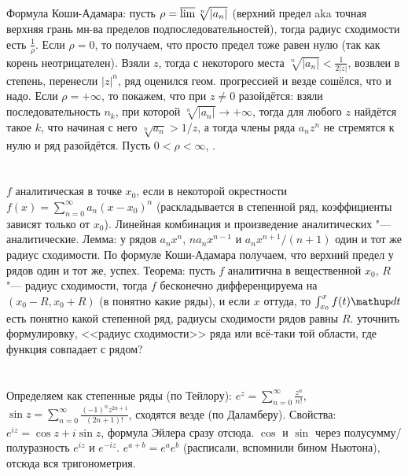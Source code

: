\section{} %
Формула Коши-Адамара: пусть $\rho=\varlimsup\sqrt[n]{|a_n|}$ (верхний предел aka точная верхняя грань мн-ва пределов подпоследовательностей), тогда радиус сходимости есть $\frac1\rho$.
Если $\rho=0$, то получаем, что просто предел тоже равен нулю (так как корень неотрицателен).
Взяли $z$, тогда с некоторого места $\sqrt[n]{|a_n|} < \frac{1}{2|z|}$, возвлеи в степень, перенесли $|z|^n$, ряд оценился геом. прогрессией и везде сошёлся, что и надо.
Если $\rho=+\infty$, то покажем, что при $z \neq 0$ разойдётся: взяли последовательность $n_k$, при которой $\sqrt[n]{|a_n|} \to +\infty$, тогда для любого
$z$ найдётся такое $k$, что начиная с него $\sqrt[n]{a_n} > 1/z$, а тогда члены ряда $a_nz^n$ не стремятся к нулю и ряд разойдётся.
Пусть $0<\rho < \infty$, \TODO.

\section{} %
$f$ аналитическая в точке $x_0$, если в некоторой окрестности $f(x)=\sum_{n=0}^\infty a_n(x-x_0)^n$ (раскладывается в степенной ряд,
коэффициенты зависят только от $x_0$).
Линейная комбинация и произведение аналитических "--- аналитические.
Лемма: у рядов $a_nx^n$, $na_nx^{n-1}$ и $a_nx^{n+1}/(n+1)$ один и тот же радиус сходимости.
По формуле Коши-Адамара получаем, что верхний предел у рядов один и тот же, успех.
Теорема: пусть $f$ аналитична в вещественной $x_0$, $R$ "--- радиус сходимости, тогда $f$ бесконечно дифференцируема на $(x_0-R, x_0+R)$
(в понятно какие ряды), и если $x$ оттуда, то $\int_{x_0}^x f(t) \d t$ есть понятно какой степенной ряд, радиусы сходимости рядов равны $R$.
\TODO уточнить формулировку, <<радиус сходимости>> ряда или всё-таки той области, где функция совпадает с рядом?

\section{} %
\TODO

\section{} %
Определяем как степенные ряды (по Тейлору): $e^z = \sum_{n=0}^\infty \frac{z^n}{n!}$,
$\sin z = \sum_{n=0}^\infty \frac{(-1)^nz^{2n+1}}{(2n+1)!}$, сходятся везде (по Даламберу).
Свойства: $e^{iz}=\cos z + i \sin z$, формула Эйлера сразу отсюда.
$\cos$ и $\sin$ через полусумму/полуразность $e^{iz}$ и $e^{-iz}$.
$e^{a+b}=e^ae^b$ (расписали, вспомнили бином Ньютона), отсюда вся тригонометрия.

\section{} %
\TODO

\section{} %
\TODO
